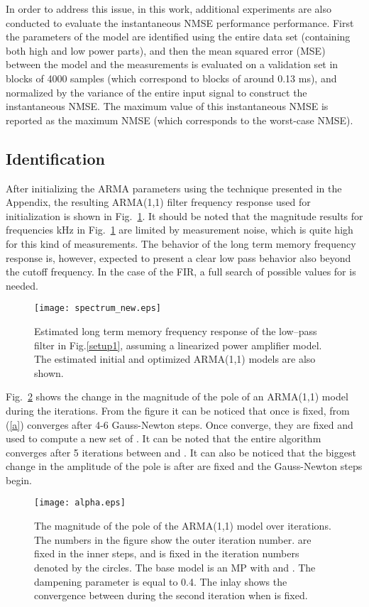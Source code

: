 \documentclass[journal]{IEEEtran}
\begin{document}
In order to address this issue, in this work, additional experiments are also conducted to evaluate the instantaneous NMSE performance performance. First the parameters of the model are identified using the entire data set (containing both high and low power parts), and then the mean squared error (MSE) between the model and the measurements is evaluated on a validation set in blocks of 4000 samples (which correspond to blocks of around 0.13 ms), and normalized by the variance of the entire input signal to construct the instantaneous NMSE. The maximum value of this instantaneous NMSE is reported as the maximum NMSE (which corresponds to the worst-case NMSE).

\subsection{Identification}
After initializing the ARMA parameters using the technique presented in the Appendix, the resulting ARMA(1,1)
filter frequency response used for initialization is shown in Fig.~\ref{spectrum}. It should be noted that the 
magnitude results for frequencies kHz in Fig.~\ref{spectrum} are limited by measurement noise, which is 
quite high for this kind of measurements. The behavior of the long term memory frequency response is, however, 
expected to present a clear low pass behavior also beyond the cutoff frequency. In the case of the FIR, a full
search of possible values for  is needed.

\begin{figure}
\centering
\texttt{[image: spectrum\_new.eps]}
\caption{Estimated long term memory frequency response of the low--pass filter in Fig.\ref{setup1}, assuming a linearized power amplifier model. The estimated initial and optimized ARMA(1,1) models are also shown.} \label{spectrum}
\end{figure}

Fig.~\ref{alpha} shows the change in the magnitude of the pole of an ARMA(1,1) model during the iterations. From the figure it can be noticed that once  is fixed,  from (\ref{a}) converges after 4-6 Gauss-Newton steps. Once  converge, they are fixed and used to compute a new set of . It can be noted that the entire algorithm converges after 5 iterations between  and . It can also be noticed that the biggest change in the amplitude of the pole is after  are fixed and the Gauss-Newton steps begin.
\begin{figure}
\centering
\texttt{[image: alpha.eps]}
\caption{The magnitude of the pole of the ARMA(1,1) model over iterations. The numbers in the figure show the outer iteration number.  are fixed in the inner steps, and  is fixed in the iteration numbers denoted by the circles. The base model is an MP with  and . The dampening parameter  is equal to 0.4. The inlay shows the convergence between during the second iteration when  is fixed.} \label{alpha}
\end{figure}
\end{document}

